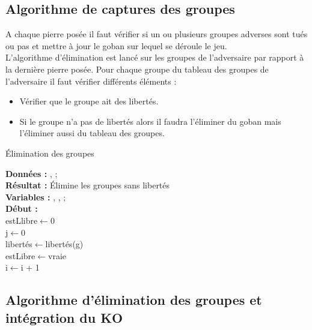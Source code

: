     \subsection{Algorithme de captures des groupes}
    A chaque pierre posée il faut vérifier si un ou plusieurs groupes adverses sont tués ou pas et mettre à jour le goban sur lequel se déroule le jeu.\\
    L'algorithme d'élimination est lancé sur les groupes de l'adversaire par rapport à la dernière pierre posée. Pour chaque groupe du tableau des groupes de l'adversaire il faut vérifier différents éléments :\\
    \begin{itemize}
    \item Vérifier que le groupe ait des libertés.
    \item Si le groupe n'a pas de libertés alors  il faudra l'éliminer du goban mais l'éliminer aussi du tableau des groupes.
    \end{itemize}
    \begin{algorithme}
    \caption{Élimination des groupes}
    \textbf{Données :}
    ,
    ;\\
    \textbf{Résultat :} Élimine les groupes sans libertés\\
    \textbf{Variables :}   
    ,
    ,
    ;\\
    \textbf{Début :}\\
    {estLlibre$\leftarrow$0\\
    j$\leftarrow$0\\
    libertés$\leftarrow$libertés(g)\\
    {
    {estLibre$\leftarrow$vraie\\
    i$\leftarrow$i + 1}
    }
    }
    \end{algorithme}
    \subsection{Algorithme d'élimination des groupes et intégration du KO}
    
